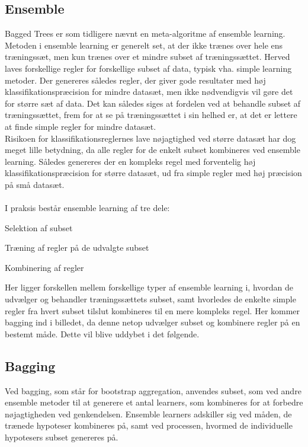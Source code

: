 \subsection{Ensemble}
Bagged Trees er som tidligere nævnt en meta-algoritme af ensemble learning. Metoden i ensemble learning er generelt set, at der ikke trænes over hele ens træningssæt, men kun trænes over et mindre subset af træningssættet. Herved laves forskellige regler for forskellige subset af data, typisk vha. simple learning metoder. Der genereres således regler, der giver gode resultater med høj klassifikationspræcision for mindre datasæt, men ikke nødvendigvis vil gøre det for større sæt af data. 
Det kan således siges at fordelen ved at behandle subset af træningssættet, frem for at se på træningssættet i sin helhed er, at det er lettere at finde simple regler for mindre datasæt.
\\Risikoen for klassifikationsreglernes lave nøjagtighed ved større datasæt har dog meget lille betydning, da alle regler for de enkelt subset kombineres ved ensemble learning. Således genereres der en kompleks regel med forventelig høj klassifikationspræcision for større datasæt, ud fra simple regler med høj præcision på små datasæt.
\\\\
I praksis består ensemble learning af tre dele:
\begin{myEnumerate}
\item Selektion af subset
\item Træning af regler på de udvalgte subset
\item Kombinering af regler 
\end{myEnumerate}

Her ligger forskellen mellem forskellige typer af ensemble learning i, hvordan de udvælger og behandler træningssættets subset, samt hvorledes de enkelte simple regler fra hvert subset tilslut kombineres til en mere kompleks regel. 
Her kommer bagging ind i billedet, da denne netop udvælger subset og kombinere regler på en bestemt måde. Dette vil blive uddybet i det følgende. 

\subsection{Bagging}
Ved bagging, som står for bootstrap aggregation, anvendes subset, som ved andre ensemble metoder til at generere et antal learners, som kombineres for at forbedre nøjagtigheden ved genkendelsen. Ensemble learners adskiller sig ved måden, de trænede hypoteser kombineres på, samt ved processen, hvormed de individuelle hypotesers subset genereres på. 


